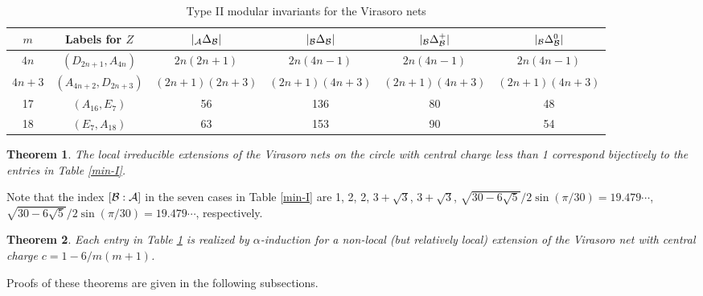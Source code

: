 \documentclass[12pt]{article}
\def\a{\alpha}
\newtheorem{theorem}{Theorem}[section]
\def\N{{\cal A}}
\def\M{{\cal B}}
\begin{document}
\begin{table}[htbp]
\begin{center}{\footnotesize
\begin{tabular}{|c|c|c|c|c|c|}\hline
$m$ & Labels for $Z$ & $|{}_\N \Delta_\M|$ & $|{}_\M \Delta_\M|$
& $|{}_\M \Delta^+_\M|$ & $|{}_\M \Delta^0_\M|$ \\ \hline
$4n$ & $(D_{2n+1}, A_{4n})$ & $2n(2n+1)$
& $2n(4n-1)$ & $2n(4n-1)$ & $2n(4n-1)$ \\ \hline
$4n+3$ & $(A_{4n+2},D_{2n+3})$ & $(2n+1)(2n+3)$
& $(2n+1)(4n+3)$ & $(2n+1)(4n+3)$ & $(2n+1)(4n+3)$ \\ \hline
17  & $(A_{16},E_7)$ & 56 & 136 & 80 & 48  \\ \hline
18  & $(E_7, A_{18})$ & 63 & 153 & 90 & 54  \\ \hline
\end{tabular}}
\caption{Type II modular invariants for the Virasoro nets}
\label{min-II}
\end{center}
\end{table}

\begin{theorem}
\label{Vir-ext}
The local irreducible extensions of the Virasoro nets on the circle
with central charge less than 1 correspond bijectively to
the entries in Table \ref{min-I}.
\end{theorem}

Note that the index $[\M:\N]$ in the seven cases in Table \ref{min-I}
are 1, 2, 2, $3+\sqrt3$, $3+\sqrt3$,
$\sqrt{30-6\sqrt{5}}/2\sin(\pi/30)=19.479\cdots$,
$\sqrt{30-6\sqrt{5}}/2\sin(\pi/30)=19.479\cdots$, respectively.

\begin{theorem}
\label{Vir-ext2}
Each entry in Table \ref{min-II} is realized by $\a$-induction for
a non-local (but relatively local) extension of the Virasoro net 
with central charge $c=1-6/m(m+1)$.
\end{theorem}

Proofs of these theorems are given in the following subsections. 
 
\end{document}

